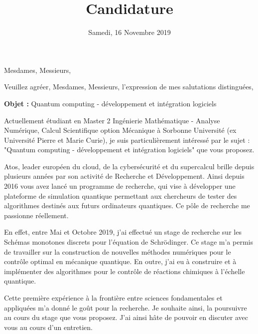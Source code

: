 \documentclass[11pt,a4paper,sans]{moderncv}        %
\title{Candidature}                               %
\begin{document}
\date{Samedi, 16 Novembre 2019}
\opening{Mesdames, Messieurs,}
\closing{Veuillez agréer, Mesdames, Messieurs, l’expression de mes salutations distinguées,}
\makelettertitle

\textbf{Objet :} Quantum computing - développement et intégration logiciels

Actuellement étudiant en Master 2 Ingénierie Mathématique - Analyse Numérique, Calcul Scientifique option Mécanique à Sorbonne Université (ex Université Pierre et Marie Curie), je suis particulièrement intéressé par le sujet : "Quantum computing - développement et intégration logiciels" que vous proposez.

Atos, leader européen du cloud, de la cybersécurité et du supercalcul brille depuis plusieurs années par son activité de Recherche et Développement. Ainsi depuis 2016 vous avez lancé un programme de recherche, qui vise à développer une plateforme de simulation quantique permettant aux chercheurs de tester des algorithmes destinés aux futurs ordinateurs quantiques. Ce pôle de recherche me passionne réellement.

En effet, entre Mai et Octobre 2019, j’ai effectué un stage de recherche sur les Schémas monotones discrets pour l'équation de Schrödinger. Ce stage m'a permis de travailler sur la construction de nouvelles méthodes numériques pour le contrôle optimal en mécanique quantique. En outre, j’ai eu à construire et à implémenter des algorithmes pour le contrôle de réactions chimiques à l'échelle quantique.

Cette première expérience à la frontière entre sciences fondamentales et appliquées m’a donné le goût pour la recherche. Je souhaite ainsi, la poursuivre au cours du stage que vous proposez. J’ai ainsi hâte de pouvoir en discuter avec vous au cours d'un entretien.




\makeletterclosing
\end{document}
